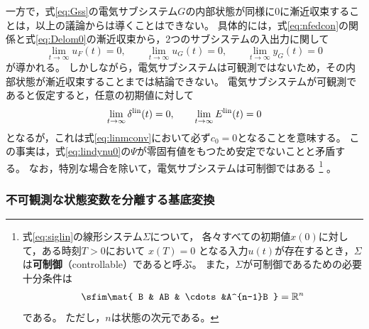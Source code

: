\documentclass[tombow,dvipdfmx]{corona-a5-1.1}
\begin{document}
一方で，式\ref{eq:Gss}の電気サブシステム$G$の内部状態が同様に0に漸近収束することは，以上の議論からは導くことはできない。
具体的には，式\ref{eq:nfedcon}の関係と式\ref{eq:Delom0}の漸近収束から，2つのサブシステムの入出力に関して
\[
\lim_{t\rightarrow \infty} u_F(t)  =0,\qquad
\lim_{t\rightarrow \infty} u_G(t)  =0,\qquad
\lim_{t\rightarrow \infty} y_G(t)  =0
\]
が導かれる。
しかしながら，電気サブシステムは可観測ではないため，その内部状態が漸近収束することまでは結論できない。
電気サブシステムが可観測であると仮定すると，任意の初期値に対して
\[
\lim_{t\rightarrow \infty}  \delta^{\rm lin}(t)  =0,\qquad
\lim_{t\rightarrow \infty}  E^{\rm lin}(t)  =0
\]
となるが，これは式\ref{eq:linmconv}において必ず$c_0=0$となることを意味する。
この事実は，式\ref{eq:lindynu0}の$\Psi$が零固有値をもつため安定でないことと矛盾する。
なお，特別な場合を除いて，電気サブシステムは可制御ではある
\footnote{
式\ref{eq:siglin}の線形システム$\Sigma$について，
各々すべての初期値$x(0)$に対して，ある時刻$T > 0$において $x(T) = 0$ となる入力$u(t)$が存在するとき，$\Sigma$は\textbf{可制御}（controllable）であると呼ぶ。
また，$\Sigma$が可制御であるための必要十分条件は
\[
\sfim \mat{
B & AB & \cdots &A^{n-1}B
}
= \mathbb{R}^n
\]
である。
ただし，$n$は状態の次元である。
}
。


\subsubsection{不可観測な状態変数を分離する基底変換}
\end{document}
